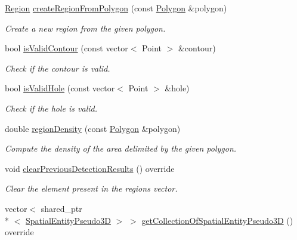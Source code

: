\begin{DoxyCompactItemize}
\hyperlink{classmultiscale_1_1analysis_1_1Region}{Region} \hyperlink{classmultiscale_1_1analysis_1_1RegionDetector_a7fda5ed5136bca752b30e02b1fdb4df8}{create\-Region\-From\-Polygon} (const \hyperlink{namespacemultiscale_1_1analysis_a37bc63d1d786b35968c450508f8bcbd3}{Polygon} \&polygon)
\begin{DoxyCompactList}\small\item\em Create a new region from the given polygon. \end{DoxyCompactList}\item 
bool \hyperlink{classmultiscale_1_1analysis_1_1RegionDetector_a9b36aef0cdb84ae1a7760d264a17f382}{is\-Valid\-Contour} (const vector$<$ Point $>$ \&contour)
\begin{DoxyCompactList}\small\item\em Check if the contour is valid. \end{DoxyCompactList}\item 
bool \hyperlink{classmultiscale_1_1analysis_1_1RegionDetector_aa9e292fcd6b7cd23381d54e78b89da7b}{is\-Valid\-Hole} (const vector$<$ Point $>$ \&hole)
\begin{DoxyCompactList}\small\item\em Check if the hole is valid. \end{DoxyCompactList}\item 
double \hyperlink{classmultiscale_1_1analysis_1_1RegionDetector_a2b4cf90726b430f6d300cb2e3d416c78}{region\-Density} (const \hyperlink{namespacemultiscale_1_1analysis_a37bc63d1d786b35968c450508f8bcbd3}{Polygon} \&polygon)
\begin{DoxyCompactList}\small\item\em Compute the density of the area delimited by the given polygon. \end{DoxyCompactList}\item 
void \hyperlink{classmultiscale_1_1analysis_1_1RegionDetector_a4a89f3a28cbb473acc32f22b49d09389}{clear\-Previous\-Detection\-Results} () override
\begin{DoxyCompactList}\small\item\em Clear the element present in the regions vector. \end{DoxyCompactList}\item 
vector$<$ shared\-\_\-ptr\\*
$<$ \hyperlink{classmultiscale_1_1analysis_1_1SpatialEntityPseudo3D}{Spatial\-Entity\-Pseudo3\-D} $>$ $>$ \hyperlink{classmultiscale_1_1analysis_1_1RegionDetector_a729a0433d9b929624960ae86e7cc1f23}{get\-Collection\-Of\-Spatial\-Entity\-Pseudo3\-D} () override

\end{DoxyCompactItemize}
